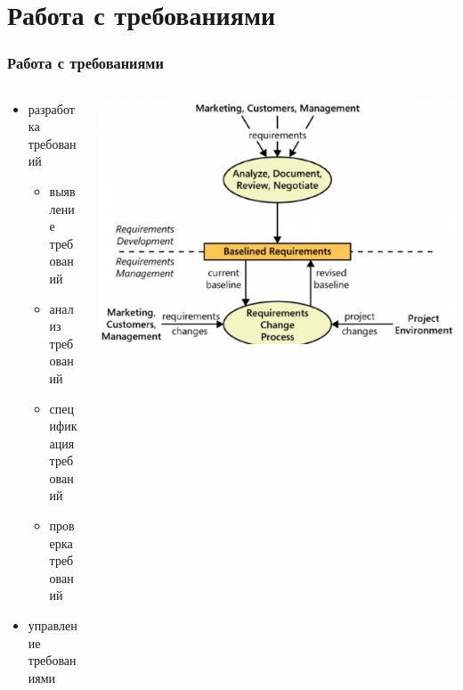 \documentclass{../../slides-style}
\begin{document}
    \section{Работа с требованиями}

    \begin{frame}
        \frametitle{Работа с требованиями}
        \begin{columns}
            \begin{column}{0.4\textwidth}
                \begin{itemize}
                    \item разработка требований
                    \begin{itemize}
                        \item выявление требований
                        \item анализ требований
                        \item спецификация требований
                        \item проверка требований
                    \end{itemize}
                    \item управление требованиями
                \end{itemize}
            \end{column}
            \begin{column}{0.6\textwidth}
                \strut
                \includegraphics[width=\textwidth]{requirementsProcess.png}
            \end{column}
        \end{columns}
    \end{frame}
\end{document}
